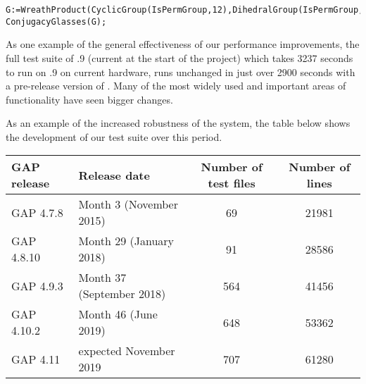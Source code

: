 {\Small
\begin{verbatim}
G:=WreathProduct(CyclicGroup(IsPermGroup,12),DihedralGroup(IsPermGroup,12));
ConjugacyGlasses(G);
\end{verbatim}
}
\noindent

%
%
%



As one example of the general effectiveness of our performance
improvements, the full test suite of .9 (current at the
start of the project) which takes 3237 seconds to run on .9 on
current hardware, runs unchanged in just over 2900 seconds with a
pre-release version of . Many of the most widely used and
important areas of \GAP functionality have seen bigger changes.  



As an example of the increased robustness of the system, the table
below shows the development of our test suite over this period.

\begin{center}
\begin{tabular}{| l | l | c | c |} 
\hline
GAP release & Release date & Number of test files & Number of lines \\
\hline GAP 4.7.8  & Month 3 (November 2015)   & 69 & 21981 \\
\hline GAP 4.8.10 & Month 29 (January 2018)   & 91 & 28586 \\
\hline GAP 4.9.3  & Month 37 (September 2018) & 564 & 41456 \\
\hline GAP 4.10.2 & Month 46 (June 2019)      & 648 & 53362 \\
\hline GAP 4.11   & expected November 2019    & 707 & 61280 \\
\hline
\end{tabular}
\end{center}

